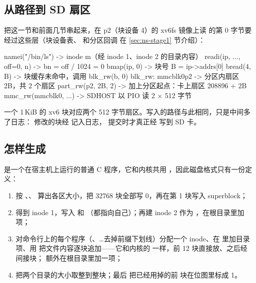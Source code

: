 \subsection{从路径到 SD 扇区}

把这一节和前面几节串起来，在 p2（块设备 4）的 xv6fs 镜像上读  的第 0 字节要经过这些层（块设备表、 和分区回调  在 \ref{sec:ns-stage1} 节介绍）：

\begin{txtcode}
namei("/bin/ls")             -> inode m（经 inode 1、inode 2 的目录内容）
readi(ip, ..., off=0, n)     -> bn = off / 1024 = 0
bmap(ip, 0)                  -> 块号 B = ip->addrs[0]
bread(4, B)                  -> 块缓存未命中，调用 blk_rw(b, 0)
blk_rw: mmcblk0p2            -> 分区内扇区 2B，共 2 个扇区
part_rw(p2, 2B, 2)           -> 加上分区起点：卡上扇区 208896 + 2B
mmc_rw(mmcblk0, ...)         -> SDHOST 以 PIO 读 2 × 512 字节
\end{txtcode}

一个 1\,KiB 的 xv6 块对应两个 512 字节扇区。写入的路径与此相同，只是中间多了日志： 修改的块经  记入日志， 提交时才真正经  写到 SD 卡。

\subsection{ 怎样生成 }

 是一个在宿主机上运行的普通 C 程序，它和内核共用 ，因此磁盘格式只有一份定义：

\begin{enumerate}
  \item 按 、、 算出各区大小，把 32768 块全部写 0，再在第 1 块写入 superblock；
  \item {} 得到 inode 1，写入  和 （都指向自己）；再建 inode 2 作为 ，在根目录里加  项；
  \item 对命令行上的每个程序（、…去掉前缀下划线）分配一个 inode、在  里加目录项、用  把文件内容逐块追加——它和内核的  一样，前 12 块直接放、之后经间接块； 额外在根目录里加一项；
  \item 把两个目录的大小取整到整块；最后  把已经用掉的前  块在位图里标成 1。
\end{enumerate}

